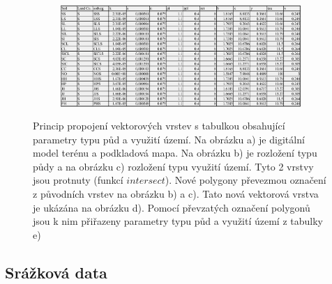 \begin{figure}[t!]
\begin{subfigure}[b]{0.4\linewidth}
    \caption{\label{fig:prunik}}
  \end{subfigure}\\
  \begin{subfigure}[b]{0.8\linewidth}
    \centering\includegraphics[width=1\linewidth]{./img/soilvegtablo.png}
    \caption{\label{fig:soilvegtablo}}
  \end{subfigure}%
  \caption{Princip propojení vektorových vrstev s tabulkou obsahující parametry typu půd a využití území. Na obrázku a) je digitální model terénu a podkladová mapa. Na obrázku b) je rozložení typu půdy a na obrázku c) rozložení typu využití území. Tyto 2 vrstvy jsou protnuty (funkcí $intersect$). Nové polygony převezmou označení z původních vrstev na obrázku b) a c). Tato nová vektorová vrstva je ukázána na obrázku d). Pomocí převzatých označení polygonů jsou k nim přiřazeny parametry typu půd a využití území z tabulky e)}
  \label{fig:soillu}
\end{figure}


























\subsection{Srážková data} \label{sec:vstupsrazka}


